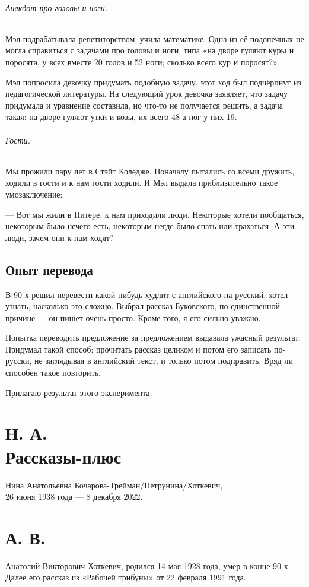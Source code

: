 \documentclass{book}
\begin{document}
\paragraph{Анекдот про головы и ноги.}
Мэл подрабатывала репетиторством, учила математике.
Одна из её подопечных не могла справиться с задачами про головы и ноги,
типа «на дворе гуляют куры и поросята, у всех вместе 20 голов и 52 ноги;
сколько всего кур и поросят?».

Мэл попросила девочку придумать подобную задачу,
этот ход был подчёрпнут из педагогической литературы.
На следующий урок девочка заявляет, что задачу придумала и уравнение составила, но что-то не получается решить,
а задача такая: на дворе гуляют утки и козы, их всего 48 а ног у них 19.

\paragraph{Гости.}
Мы прожили пару лет в Стэйт Коледже.
Поначалу пытались со всеми дружить, ходили в гости и к нам гости ходили.
И Мэл выдала приблизительно такое умозаключение:

--- Вот мы жили в Питере, к нам приходили люди.
Некоторые хотели пообщаться, некоторым было нечего есть, некоторым негде было спать или трахаться.
А эти люди, зачем они к нам ходят?

\backmatter

\chapter*{Опыт перевода}

В 90-х решил перевести какой-нибудь худлит с английского на русский, хотел узнать, насколько это сложно.
Выбрал рассказ Буковского, по единственной причине --- он пишет очень просто.
Кроме того, я его сильно уважаю.

Попытка переводить предложение за предложением выдавала ужасный результат.
Придумал такой способ: прочитать рассказ целиком и потом его записать по-русски, не заглядывая в английский текст, и только потом подправить.
Вряд ли способен такое повторить.

Прилагаю результат этого эксперимента.



\part*{Н. А.\\
Рассказы-плюс}
Нина Анатольевна Бочарова-Трейман/Петрунина/Хоткевич,\\
26 июня 1938 года --- 8 декабря 2022.




\part*{А. В.\\
}

Анатолий Викторович Хоткевич, родился 14 мая 1928 года, умер в конце 90-х.
Далее его рассказ из «Рабочей трибуны» от 22 февраля 1991 года.



\tableofcontents
\end{document}
